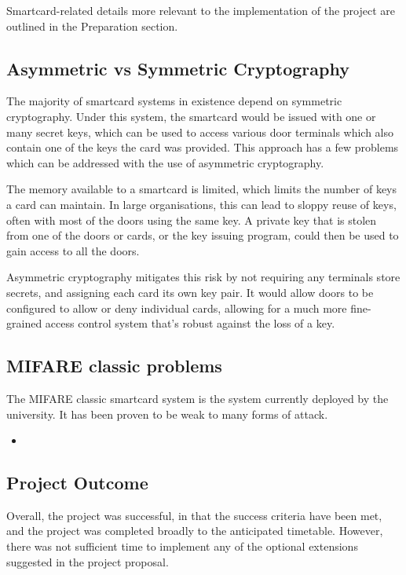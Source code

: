 \documentclass[12pt]{article}
\begin{document}
Smartcard-related details more relevant to the implementation of the project are outlined in the Preparation section.

\subsection{Asymmetric vs Symmetric Cryptography}
The majority of smartcard systems in existence depend on symmetric cryptography. Under this system, the smartcard would be issued with one or many secret keys, which can be used to access various door terminals which also contain one of the keys the card was provided. This approach has a few problems which can be addressed with the use of asymmetric cryptography.

The memory available to a smartcard is limited, which limits the number of keys a card can maintain. In large organisations, this can lead to sloppy reuse of keys, often with most of the doors using the same key. A private key that is stolen from one of the doors or cards, or the key issuing program, could then be used to gain access to all the doors.

Asymmetric cryptography mitigates this risk by not requiring any terminals store secrets, and assigning each card its own key pair. It would allow doors to be configured to allow or deny individual cards, allowing for a much more fine-grained access control system that's robust against the loss of a key.

\subsection{MIFARE classic problems}
The MIFARE classic smartcard system is the system currently deployed by the university. It has been proven to be weak to many forms of attack.

\begin{itemize}
	\item 
\end{itemize}



\subsection{Project Outcome}
Overall, the project was successful, in that the success criteria have been met, and the project was completed broadly to the anticipated timetable. However, there was not sufficient time to implement any of the optional extensions suggested in the project proposal.
\end{document}
